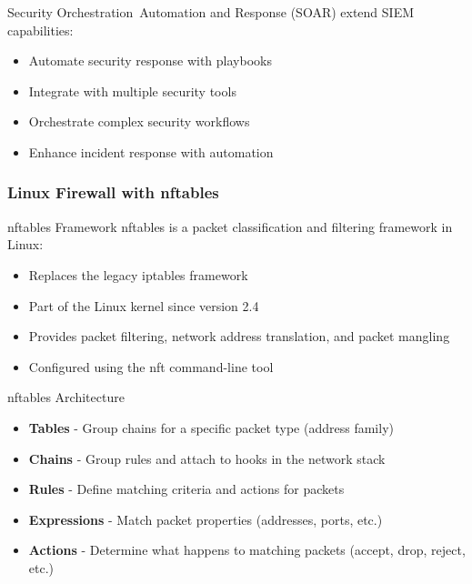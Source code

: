 \begin{concept}{Security Orchestration\, Automation and Response (SOAR)}
extend SIEM capabilities:
\begin{itemize}
    \item Automate security response with playbooks
    \item Integrate with multiple security tools
    \item Orchestrate complex security workflows
    \item Enhance incident response with automation
\end{itemize}
\end{concept}

\multend

\subsubsection{Linux Firewall with nftables}

\begin{definition}{nftables Framework}
nftables is a packet classification and filtering framework in Linux:
\begin{itemize}
    \item Replaces the legacy iptables framework
    \item Part of the Linux kernel since version 2.4
    \item Provides packet filtering, network address translation, and packet mangling
    \item Configured using the nft command-line tool
\end{itemize}
\end{definition}

\begin{concept}{nftables Architecture}
\begin{itemize}
    \item \textbf{Tables} - Group chains for a specific packet type (address family)
    \item \textbf{Chains} - Group rules and attach to hooks in the network stack
    \item \textbf{Rules} - Define matching criteria and actions for packets
    \item \textbf{Expressions} - Match packet properties (addresses, ports, etc.)
    \item \textbf{Actions} - Determine what happens to matching packets (accept, drop, reject, etc.)
\end{itemize}
\end{concept}

